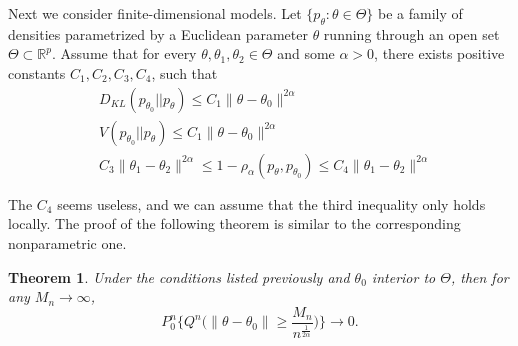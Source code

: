 \documentclass[11pt, letterpaper]{article}
\theoremstyle{plain}
\newtheorem{theorem}{\quad\quad Theorem}
\theoremstyle{definition}
\theoremstyle{remark}
\begin{document}
Next we consider finite-dimensional models.
Let $\{p_{\theta}: \theta\in \Theta\}$ be a family of densities parametrized by a Euclidean parameter $\theta$ running through an open set $\Theta\subset \mathbb{R}^p$. 
Assume that for every $\theta, \theta_1,\theta_2 \in \Theta$ and some $\alpha>0$,
there exists positive constants $C_1,C_2,C_3,C_4$, such that
$$
\begin{aligned}
    &D_{KL}(p_{\theta_0} || p_{\theta})\leq C_1 \|\theta-\theta_0\|^{2\alpha}\\
    &V(p_{\theta_0} || p_{\theta})\leq C_1 \|\theta-\theta_0\|^{2\alpha}\\
    &C_3 \|\theta_1-\theta_2\|^{2\alpha}\leq 1-\rho_{\alpha}(p_{\theta} , p_{\theta_0})\leq C_4 \|\theta_1-\theta_2\|^{2\alpha}\\
    &\\
\end{aligned}
$$
The $C_4$ seems useless, and we can assume that the third inequality only holds locally.
The proof of the following theorem is similar to the corresponding nonparametric one.
\begin{theorem}
    Under the conditions listed previously and $\theta_0$ interior to $\Theta$, then for any $M_n\to \infty$,
    $$
    P_0^n \Big\{ Q^n \big( \|\theta-\theta_0\|\geq \frac{M_n}{n^{\frac{1}{2\alpha}}}\big)\Big\}
    \to  0
    .
    $$
\end{theorem}
\end{document}

